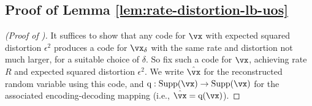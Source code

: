 \documentclass[../../book-main.tex]{subfiles}
\begin{document}
\subsection{Proof of Lemma \ref{lem:rate-distortion-lb-uos}}\label{sec:app-rate-dist-deferred-proofs}

\begin{proof}[(Proof of )]
    It suffices to show that any code for $\vx$ with expected squared distortion
    $\epsilon^2$ produces a code for $\vx_{\delta}$ with the same rate and
    distortion not much larger, for a suitable choice of $\delta$.
    So fix such a code for $\vx$, achieving rate $R$ and expected squared
    distortion $\epsilon^2$. We write $\hat{\vx}$ for the reconstructed random
    variable using this code, and $\mathrm{q} : \Supp(\vx) \to \Supp(\vx)$
    for the associated encoding-decoding mapping (i.e., $\hat{\vx}
    = \mathrm{q}(\vx)$).


\end{proof}
\end{document}
